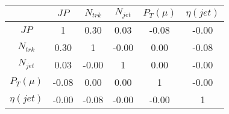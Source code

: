 \begin{tabular}{|c|c|c|c|c|c|} 
\hline
 & $JP$ & $N_{trk}$ & $N_{jet}$ & $P_{T} (\mu)$ & $\eta (jet)$ \\ \hline
$JP$ & 1 & 0.30 & 0.03 & -0.08 & -0.00 \\
$N_{trk}$ & 0.30 & 1 & -0.00 & 0.00 & -0.08 \\
$N_{jet}$ & 0.03 & -0.00 & 1 & 0.00 & -0.00 \\
$P_{T} (\mu)$ & -0.08 & 0.00 & 0.00 & 1 & -0.00 \\
$\eta (jet)$ & -0.00 & -0.08 & -0.00 & -0.00 & 1 \\
\hline 
\end{tabular} 


